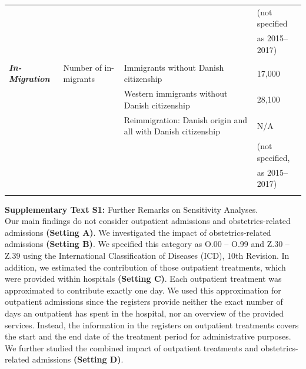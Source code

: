 \begin{landscape}
\begin{table}[H]
\begin{tabular}{llll}
                   &                         &                                                               & (not specified  \\
                   &                         &                                                               & as 2015--2017)   \\
                   &                         &                                                               &                         \\
\textbf{\textit{In-Migration}}       & Number of in-migrants   & Immigrants without Danish citizenship                         & 17,000                  \\
                   &                         & Western immigrants without Danish citizenship                 & 28,100                  \\
                   &                         & Reimmigration: Danish origin and all with Danish citizenship  & N/A                     \\
                   &                         &                                                               & (not  specified, \\
                   &                         &                                                               &  as 2015--2017)   \\ \hhline{====}
\end{tabular}
\label{ch5:tabS1}
\end{table}


\end{landscape}




\newpage

\textbf{Supplementary Text S1:} Further Remarks on Sensitivity Analyses.\\

Our main findings do not consider outpatient admissions and obstetrics-related 
admissions \textbf{(Setting A)}. We investigated the impact of obstetrics-related 
admissions \textbf{(Setting B)}. We specified this category as O.00 -- O.99 and 
Z.30 -- Z.39 using the International Classification of Diseases (ICD), 10th Revision. In addition, 
we estimated the contribution of those outpatient treatments, which were provided 
within hospitals \textbf{(Setting C)}. Each outpatient treatment was approximated to contribute 
exactly one day. We used this approximation for outpatient admissions since the 
registers provide neither the exact number of days an outpatient has spent in the 
hospital, nor an overview of the provided services. Instead, the information in 
the registers on outpatient treatments covers the start and the end date of the 
treatment period for administrative purposes. We further studied the combined impact 
of outpatient treatments and obstetrics-related admissions \textbf{(Setting D)}.

